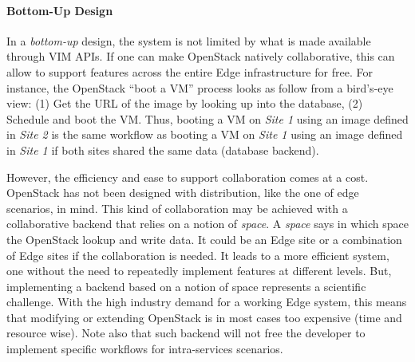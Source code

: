 


\paragraph{Bottom-Up Design}
In a \emph{bottom-up} design, the system is not limited by what is
made available through VIM APIs. If one can make OpenStack natively
collaborative, this can allow to support features across the entire
Edge infrastructure for free. For instance, the OpenStack ``boot a
VM'' process looks as follow from a bird's-eye view: (1) Get the URL
of the image by looking up into the database, (2) Schedule and boot
the VM. Thus, booting a VM on \emph{Site 1} using an image defined in
\emph{Site 2} is the same workflow as booting a VM on \emph{Site 1}
using an image defined in \emph{Site 1} if both sites shared the same
data (\ie database backend).

However, the efficiency and ease to support collaboration comes at a
cost. OpenStack has not been designed with distribution, like the one
of edge scenarios, in mind. This kind of collaboration may be achieved
with a collaborative backend that relies on a notion of \emph{space}.
A \emph{space} says in which space the OpenStack lookup and write
data. It could be an Edge site or a combination of Edge sites if the
collaboration is needed. It leads to a more efficient system, one
without the need to repeatedly implement features at different levels.
But, implementing a backend based on a notion of space represents a
scientific challenge. With the high industry demand for a working Edge
system, this means that modifying or extending OpenStack is in most
cases too expensive (time and resource wise). Note also that such
backend will not free the developer to implement specific workflows
for intra-services scenarios.


